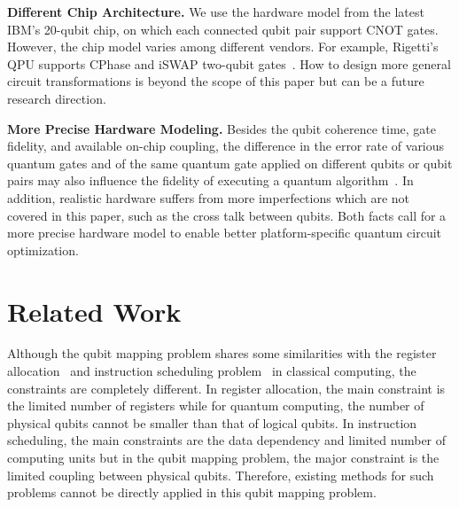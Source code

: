 \documentclass[journal,10pt,twocolumn]{IEEEtran}
\begin{document}
\textbf{Different Chip Architecture.} We use the hardware model from the latest IBM's 20-qubit chip, on which each connected qubit pair support CNOT gates. 
However, the chip model varies among different vendors. For example, Rigetti's QPU supports CPhase and iSWAP two-qubit gates~\cite{RigettiQPU,sete2016functional}. 
How to design more general circuit transformations is beyond the scope of this paper but can be a future research direction.


\textbf{More Precise Hardware Modeling.} Besides the qubit coherence time, gate fidelity, and available on-chip coupling, the difference in the error rate of various quantum gates and of the same quantum gate applied on different qubits or qubit pairs may also influence the fidelity of executing a quantum algorithm~\cite{tannu2018case}. 
In addition, realistic hardware suffers from more imperfections which are not covered in this paper, such as the cross talk between qubits. Both facts call for a more precise hardware model to enable better platform-specific quantum circuit optimization.

\section{Related Work}\label{sec:relatedwork}

Although the qubit mapping problem shares some similarities with the register allocation~\cite{chaitin1982register,poletto1999linear} and instruction scheduling problem~\cite{tomasulo1967efficient,hennessy1983postpass,codina2001unified} in classical computing, the constraints are completely different. 
In register allocation, the main constraint is the limited number of registers while for quantum computing, the number of physical qubits cannot be smaller than that of logical qubits.
In instruction scheduling, the main constraints are the data dependency and limited number of computing units but in the qubit mapping problem, the major constraint is the limited coupling between physical qubits.
Therefore, existing methods for such problems cannot be directly applied in this qubit mapping problem.
\end{document}
